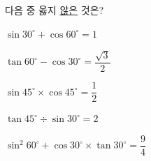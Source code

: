다음 중 옳지 \underline{않은} 것은?
\begin{choicesii}{\rule[-3ex]{0pt}{8ex}$\sin 30^\circ+\cos 60^\circ=1$}{\rule[-3ex]{0pt}{8ex}$\tan 60^\circ-\cos 30^\circ=\dfrac{\sqrt{3}}{2}$}{\rule[-3ex]{0pt}{8ex}$\sin 45^\circ\times\cos 45^\circ=\dfrac{1}{2}$}{\rule[-3ex]{0pt}{8ex}$\tan 45^\circ\div\sin 30^\circ=2$}{\rule[-3ex]{0pt}{8ex}$\sin^2 60^\circ+\cos 30^\circ\times\tan 30^\circ=\dfrac{9}{4}$}\end{choicesii}
